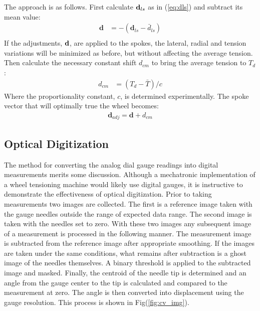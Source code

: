\documentclass[journal]{IEEEtran}
\begin{document}
The approach is as follows.  First calculate ${\bf d}_{ls}$ as in (\ref{eq:dls}) and subtract its mean value:
\begin{align*}
    \mathbf{d} &= -(\mathbf{d}_{ls} - \bar d_{ls})\\
\end{align*}
If the adjustments, $\bf d$, are applied to the spokes, the lateral, radial and tension variations will be minimized as before, but without affecting the average tension.  Then calculate the necessary constant shift $d_{cm}$ to bring the average tension to $T_d$:
\begin{align*}
    d_{cm} &=  (T_d - \bar T)/c
\end{align*}
Where the proportionality constant, $c$, is determined experimentally. The spoke vector that will optimally true the wheel becomes:
\begin{align}
    \mathbf{d}_{adj} =\mathbf{d}  + d_{cm} 
\end{align}

\subsection{Optical Digitization}
The method for converting the analog dial gauge readings into digital measurements merits some discussion.  Although a mechatronic implementation of a wheel tensioning machine would likely use digital gauges, it is instructive to demonstrate the effectiveness of optical digitization.  Prior to taking measurements two  images are collected.  The first is a reference image taken with the gauge needles outside the range of expected data range.  The second image is taken with the needles set to zero.  With these two images any subsequent image of a measurement is processed in the following manner.  The measurement image is subtracted from the reference image after appropriate smoothing.  If the images are taken under the same conditions, what remains after subtraction is a ghost image of the needles themselves. A binary threshold is applied to the subtracted image and masked.  Finally, the centroid of the needle tip is determined and an angle from the gauge center to the tip is calculated and compared to the measurement at zero.  The angle is then converted into displacement using the gauge resolution. This process is shown in Fig(\ref{fig:cv_img}).  
\end{document}
